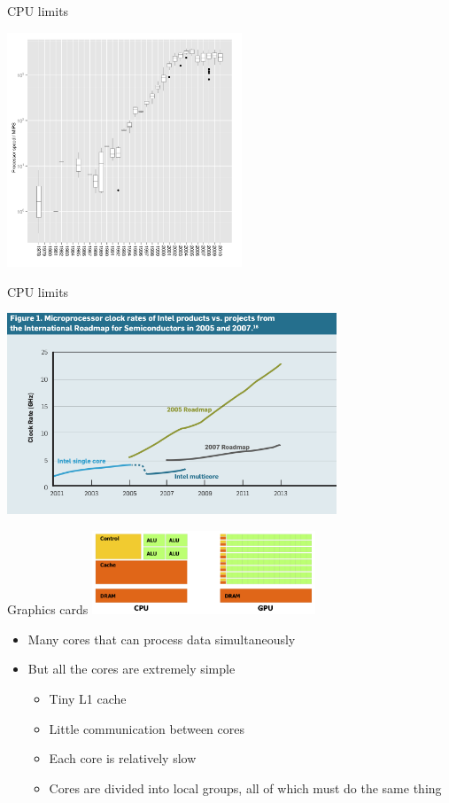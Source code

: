 \documentclass{beamer}
\begin{document}
\begin{frame}{CPU limits}
\begin{center}
\includegraphics[height=7cm]{clockspeed.pdf}
\end{center}
\end{frame}

\begin{frame}{CPU limits}
\begin{center}
\includegraphics[height=6cm]{clockrates.png}
\end{center}
\end{frame}

\begin{frame}{Graphics cards}
	\includegraphics[height=2.5cm]{cpugpu.png}
	\begin{itemize}
		\item Many cores that can process data simultaneously
		\item But all the cores are extremely simple
		\begin{itemize}
			\item Tiny L1 cache
			\item Little communication between cores
			\item Each core is relatively slow
			\item Cores are divided into local groups, all of which must do the same thing
		\end{itemize}
	\end{itemize}
\end{frame}
\end{document}
